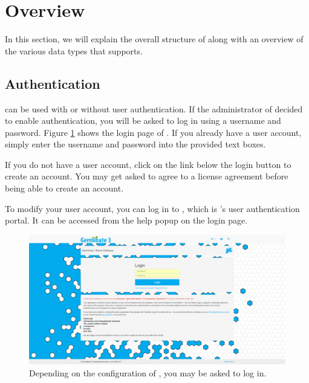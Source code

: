 \section{Overview}
In this section, we will explain the overall structure of {\germinate} along with an overview of the various data types that {\germinate} supports.

\subsection{Authentication}
{\germinate} can be used with or without user authentication. If the administrator of {\germinate} decided to enable authentication, you will be asked to log in using a username and password. Figure \ref{fig:overview:login} shows the login page of {\germinate}. If you already have a user account, simply enter the username and password into the provided text boxes.

If you do not have a user account, click on the link below the login button to create an account. You may get asked to agree to a license agreement before being able to create an account.

To modify your user account, you can log in to {\gatekeeper}, which is {\germinate}'s user authentication portal. It can be accessed from the help popup on the login page.

\begin{figure}
	\centering
	\includegraphics[width=0.85\linewidth]{img/overview/login.png}
	\caption{Depending on the configuration of {\germinate}, you may be asked to log in.}
	\label{fig:overview:login}
\end{figure}

